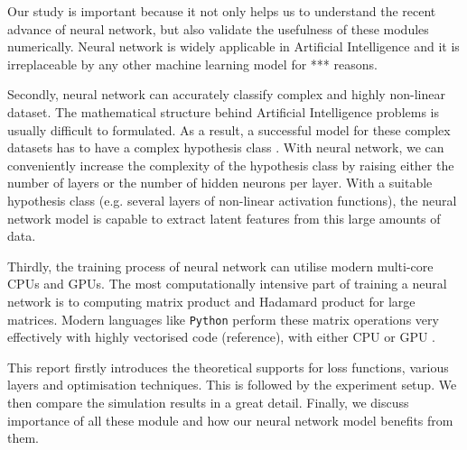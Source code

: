Our study is important because it not only helps us to understand the recent advance of neural network,  but also validate the usefulness of these modules numerically. Neural network is widely applicable in Artificial Intelligence and it is irreplaceable by any other machine learning model for *** reasons.   

Secondly, neural network can accurately classify complex and highly non-linear dataset. The mathematical structure behind Artificial Intelligence problems is usually difficult to formulated. As a result, a successful model for these complex datasets has to have a complex hypothesis class \citep{Bishop:2006:PRM:1162264}. 
With neural network, we can conveniently increase the complexity of the hypothesis class by raising either the number of layers or the number of hidden neurons per layer. 
With a suitable hypothesis class (e.g. several layers of non-linear activation functions), the neural network model is capable to extract latent features from this large amounts of data.

Thirdly, the training process of neural network can utilise modern multi-core CPUs and GPUs. The most computationally intensive part of training a neural network is to computing matrix product and Hadamard product for large matrices. Modern languages like \texttt{Python} perform these matrix operations very effectively with highly vectorised code (reference), with either CPU or GPU .





This report firstly introduces the theoretical supports for loss functions, various layers and optimisation techniques. 
This is followed by the experiment setup. We then compare the simulation results in a great detail.
Finally, we discuss importance of all these module and how our neural network model benefits from them.
